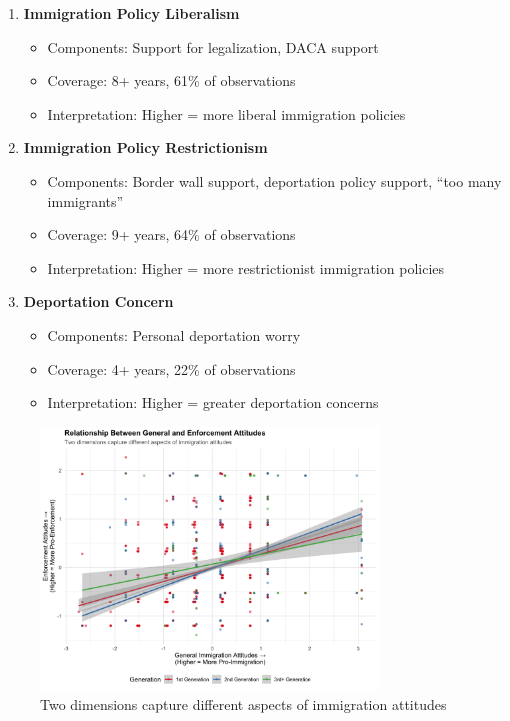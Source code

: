 \documentclass[11pt,letterpaper]{article}
\begin{document}
\begin{enumerate}
    \item \textbf{Immigration Policy Liberalism}
    \begin{itemize}
        \item Components: Support for legalization, DACA support
        \item Coverage: 8+ years, 61\% of observations
        \item Interpretation: Higher = more liberal immigration policies
    \end{itemize}
    
    \item \textbf{Immigration Policy Restrictionism}
    \begin{itemize}
        \item Components: Border wall support, deportation policy support, ``too many immigrants''
        \item Coverage: 9+ years, 64\% of observations
        \item Interpretation: Higher = more restrictionist immigration policies
    \end{itemize}
    
    \item \textbf{Deportation Concern}
    \begin{itemize}
        \item Components: Personal deportation worry
        \item Coverage: 4+ years, 22\% of observations
        \item Interpretation: Higher = greater deportation concerns
    \end{itemize}
\end{enumerate}

\begin{figure}[H]
    \centering
    \includegraphics[width=0.8\textwidth]{../../outputs/figure_v4_2_dimensions_scatter_robust.png}
    \caption{Two dimensions capture different aspects of immigration attitudes}
    \label{fig:dimensions}
\end{figure}
\end{document}
